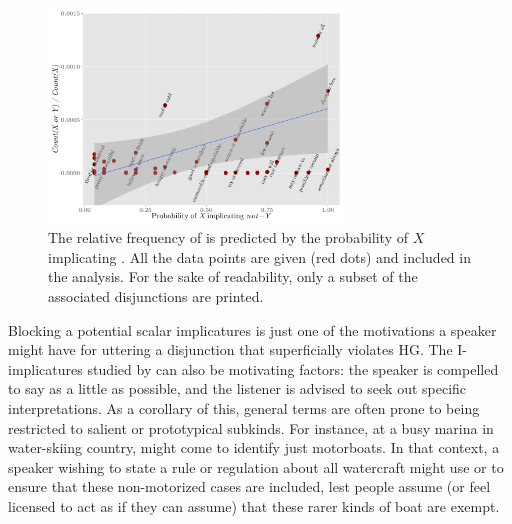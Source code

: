 \documentclass[12pt,twoside]{article}
\renewcommand{\_}{\textbf{\textunderscore\hspace{-4pt}\textunderscore\hspace{-3pt}\textunderscore\hspace{-4pt}\textunderscore}\hspace{0.5pt}}			%
\begin{document}
\begin{figure}[tp]
  \centering
  \includegraphics[width=0.7\textwidth]{fig/disjunction-and-implicature}
  \caption{The relative frequency of  is predicted by the
    probability of $X$ implicating .  All the data points
    are given (red dots) and included in the analysis. For the sake of
    readability, only a subset of the associated disjunctions are
    printed.}
  \label{fig:chemla}
\end{figure}

Blocking a potential scalar implicatures is just one of the
motivations a speaker might have for uttering a disjunction that
superficially violates HG. The I-implicatures studied by
\citet{Levinson00} can also be motivating factors: the speaker is
compelled to say as a little as possible, and the listener is advised
to seek out specific interpretations. As a corollary of this, general
terms are often prone to being restricted to salient or prototypical
subkinds. For instance, at a busy marina in water-skiing country,
 might come to identify just motorboats. In that context, a
speaker wishing to state a rule or regulation about all watercraft
might use  or  to ensure that
these non-motorized cases are included, lest people assume (or feel
licensed to act as if they can assume) that these rarer kinds of boat
are exempt.


\end{document}
